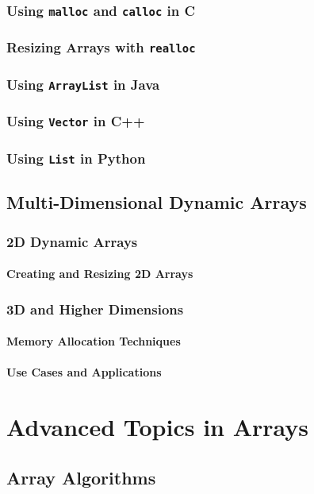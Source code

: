 \documentclass[12pt, oneside]{book}
\begin{document}
	\subsection{Using \texttt{malloc} and \texttt{calloc} in C}
	\subsection{Resizing Arrays with \texttt{realloc}}
	\subsection{Using \texttt{ArrayList} in Java}
	\subsection{Using \texttt{Vector} in C++}
	\subsection{Using \texttt{List} in Python}
	
	\section{Multi-Dimensional Dynamic Arrays}
	\subsection{2D Dynamic Arrays}
	\subsubsection{Creating and Resizing 2D Arrays}
	\subsection{3D and Higher Dimensions}
	\subsubsection{Memory Allocation Techniques}
	\subsubsection{Use Cases and Applications}
	
	\chapter{Advanced Topics in Arrays}
	
	\section{Array Algorithms}
\end{document}
